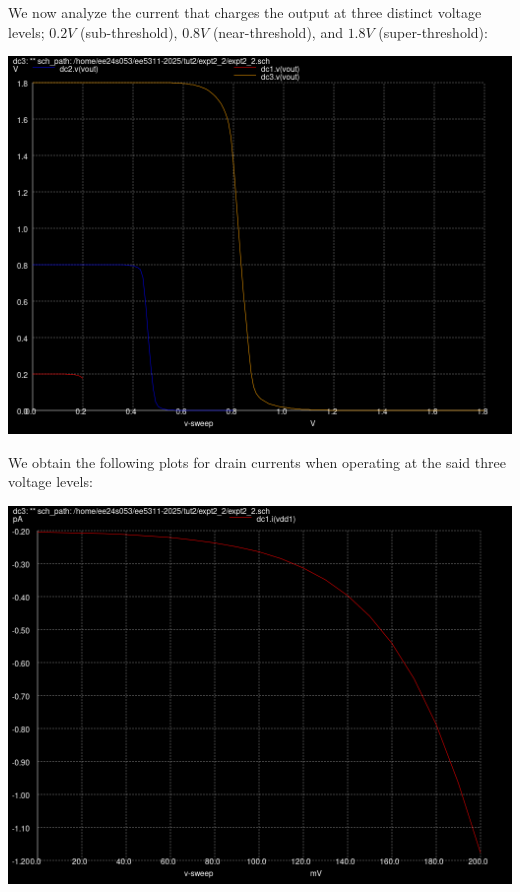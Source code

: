 \documentclass[10pt,a4paper]{article}
\begin{document}
\noindent We now analyze the current that charges the output at three distinct voltage levels; $0.2V$ (sub-threshold), $0.8V$ (near-threshold), and $1.8V$ (super-threshold):
\begin{center}
\includegraphics[scale=0.3]{tut2/reports/media/expt2_2_vtc.png}
\end{center}

\noindent We obtain the following plots for drain currents when operating at the said three voltage levels:

\begin{center}
\includegraphics[scale=0.3]{tut2/reports/media/expt2_2_ids_0_2.png}
\end{center}
\end{document}
